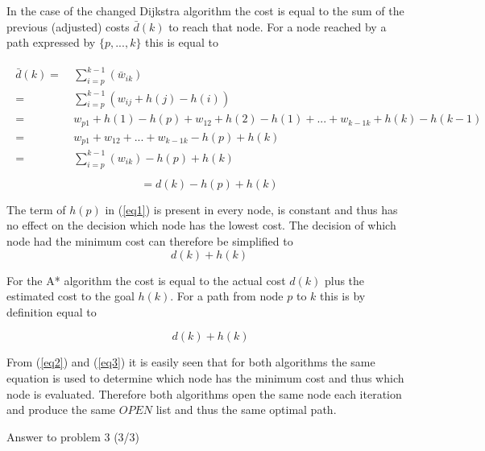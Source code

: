 \documentclass[a4paper]{article}
\begin{document}
In the case of the changed Dijkstra algorithm the cost is equal to the sum of the previous (adjusted) costs $\bar{d}(k)$ to reach that node. For a node reached by a path expressed by $\{p, ... ,k\}$ this is equal to 

\begin{align}
\begin{split}
\bar{d}(k) = &\ \sum_{i=p}^{k-1}( \bar{w}_{ik}) \\
= &\ \sum_{i=p}^{k-1}(w_{ij} + h(j) - h(i)) \\
= &\ w_{p1} + h(1) - h(p) + w_{12} + h(2) - h(1) + ... + w_{k-1 k} + h(k) - h(k-1) \\
= &\ w_{p1} + w_{12} + ... + w_{k-1 k} - h(p) + h(k)\\
=&\ \sum_{i=p}^{k-1}(w_{ik}) - h(p) + h(k)\\
\end{split}
\end{align}
\begin{equation} \label{eq1}
= d(k) - h(p) + h(k)
\end{equation} 	

The term of $h(p)$ in (\ref{eq1}) is present in every node, is constant and thus has no effect on the decision which node has the lowest cost. The decision of which node had the minimum cost can therefore be simplified to
\begin{equation} \label{eq2}
d(k) + h(k)
\end{equation} 	   

For the A* algorithm the cost is equal to the actual cost $d(k)$ plus the estimated cost to the goal $h(k)$. For a path from node $p$ to $k$ this is by definition equal to 

\begin{equation} \label{eq3}
\ d(k) + h(k)
\end{equation}

From (\ref{eq2}) and (\ref{eq3}) it is easily seen that for both algorithms the same equation is used to determine which node has the minimum cost and thus which node is evaluated. Therefore both algorithms open the same node each iteration and produce the same $OPEN$ list and thus the same optimal path.

\newpage
\thispagestyle{empty}
\noindent	\hrulefill
\begin{flushright}
			Answer to problem 3 (3/3)
\end{flushright}
\noindent	\hrulefill
\end{document}
